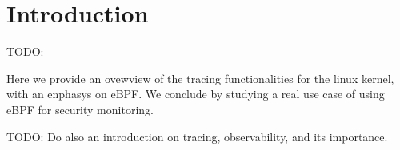 \chapter{Introduction}

TODO:

Here we provide an ovewview of the tracing functionalities for the linux kernel,
with an enphasys on eBPF. We conclude by studying a real use case of using eBPF
for security monitoring.

TODO: Do also an introduction on tracing, observability, and its importance.
